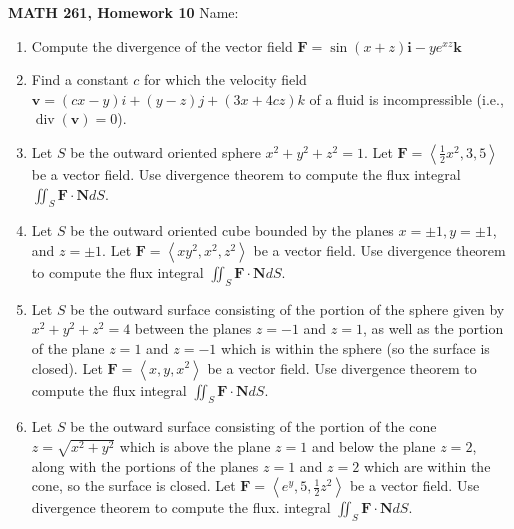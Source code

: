 \documentclass[10pt]{article}
\begin{document}
\textbf{MATH 261, Homework 10} \hfill Name: \underline{\hspace{6cm}}

\bigskip



\begin{enumerate}
  \item Compute the divergence of the vector field $\mathbf{F}=\sin (x+z) \mathbf{i}-y e^{x z} \mathbf{k}$
	
	 \vspace*{0.35\textheight}
	
  \item Find a constant $c$ for which the velocity field $\mathbf{v}=(c x-y) i+(y-z) j+(3 x+4 c z) k$ of a fluid is incompressible (i.e., $\operatorname{div}(\mathbf{v})=0$).
	
	 \vspace*{0.5\textheight}
	
  \item Let $S$ be the outward oriented sphere $x^{2}+y^{2}+z^{2}=1$. Let $\mathbf{F}=\left\langle\frac{1}{2} x^{2}, 3,5\right\rangle$ be a vector field. Use divergence theorem to compute the flux integral $\iint_{S} \mathbf{F} \cdot \mathbf{N} d S$.
	 
	\vspace*{0.42\textheight}
	
  \item Let $S$ be the outward oriented cube bounded by the planes $x= \pm 1, y= \pm 1$, and $z= \pm 1$. Let $\mathbf{F}=\left\langle x y^{2}, x^{2}, z^{2}\right\rangle$ be a vector field. Use divergence theorem to compute the flux integral $\iint_{S} \mathbf{F} \cdot \mathbf{N} d S$.
	 \vspace*{0.41\textheight}
	
  \item Let $S$ be the outward surface consisting of the portion of the sphere given by $x^{2}+y^{2}+ z^{2}=4$ between the planes $z=-1$ and $z=1$, as well as the portion of the plane $z=1$ and $z=-1$ which is within the sphere (so the surface is closed). Let $\mathbf{F}=\left\langle x, y, x^{2}\right\rangle$ be a vector field. Use divergence theorem to compute the flux integral $\iint_{S} \mathbf{F} \cdot \mathbf{N} d S$.
	
	 \vspace*{0.35\textheight}
	
  \item Let $S$ be the outward surface consisting of the portion of the cone $z=\sqrt{x^{2}+y^{2}}$ which is above the plane $z=1$ and below the plane $z=2$, along with the portions of the planes $z=1$ and $z=2$ which are within the cone, so the surface is closed. Let $\mathbf{F}=\left\langle e^{y}, 5, \frac{1}{2} z^{2}\right\rangle$ be a vector field. Use divergence theorem to compute the flux. integral $\iint_{S} \mathbf{F} \cdot \mathbf{N} d S$.
  

\end{enumerate}
\end{document}
